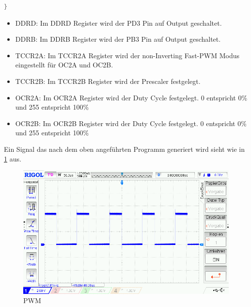 \begin{itemize}
\begin{lstlisting}[caption=$\mu$C-Programm,language=c]
}
\end{lstlisting}

\begin{itemize}
\item DDRD: Im DDRD Register wird der PD3 Pin auf Output geschaltet.
\item DDRB: Im DDRB Register wird der PB3 Pin auf Output geschaltet.
\item TCCR2A: Im TCCR2A Register wird der non-Inverting Fast-PWM Modus eingestellt für OC2A und OC2B. 
\item TCCR2B: Im TCCR2B Register wird der Prescaler festgelegt. 
\item OCR2A: Im OCR2A Register wird der Duty Cycle festgelegt. 0 entspricht 0\% und 255 entspricht 100\% 
\item OCR2B: Im OCR2B Register wird der Duty Cycle festgelegt. 0 entspricht 0\% und 255 entspricht 100\% 
\end{itemize}
\end{itemize}

Ein Signal das nach dem oben angeführten Programm generiert wird sieht wie in \ref{PWM} aus.
\begin{figure}[H] 
\begin{center}

\includegraphics[width=13cm]{Bilder/PWM/pwm}
\caption{PWM}
\label{PWM}

\end{center}
\end{figure}
\newpage
